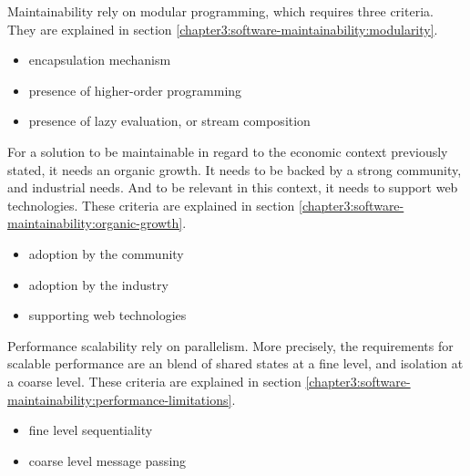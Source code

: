 Maintainability rely on modular programming, which requires three criteria.
They are explained in section \ref{chapter3:software-maintainability:modularity}.
\begin{itemize}
\item encapsulation mechanism
\item presence of higher-order programming
\item presence of lazy evaluation, or stream composition
\end{itemize}

For a solution to be maintainable in regard to the economic context previously stated, it needs an organic growth.
It needs to be backed by a strong community, and industrial needs.
And to be relevant in this context, it needs to support web technologies.
These criteria are explained in section \ref{chapter3:software-maintainability:organic-growth}.
\begin{itemize}
\item adoption by the community
\item adoption by the industry
\item supporting web technologies
\end{itemize}

Performance scalability rely on parallelism.
More precisely, the requirements for scalable performance are an blend of shared states at a fine level, and isolation at a coarse level. 
These criteria are explained in section \ref{chapter3:software-maintainability:performance-limitations}.
\begin{itemize}
\item fine level sequentiality
\item coarse level message passing
\end{itemize}







